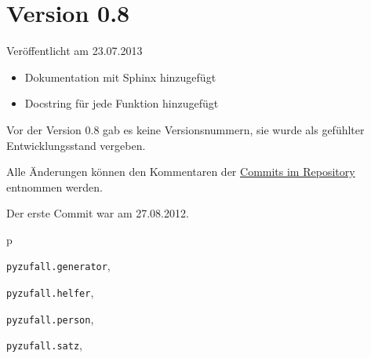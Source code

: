 \documentclass[a4paper,12pt,oneside]{sphinxmanual}
\begin{document}
\section{Version 0.8}
\label{changelog:version-0-8}
Veröffentlicht am 23.07.2013
\begin{itemize}
\item {} 
Dokumentation mit Sphinx hinzugefügt

\item {} 
Docstring für jede Funktion hinzugefügt

\end{itemize}

Vor der Version 0.8 gab es keine Versionsnummern, sie wurde als gefühlter Entwicklungsstand vergeben.

Alle Änderungen können den Kommentaren der \href{https://github.com/davidak/pyzufall/commits/}{Commits im Repository} entnommen werden.

Der erste Commit war am 27.08.2012.


\renewcommand{\indexname}{Python-Modulindex}
\begin{theindex}
\def\bigletter#1{{\Large\sffamily#1}\nopagebreak\vspace{1mm}}
\bigletter{p}
\item {\texttt{pyzufall.generator}}, \pageref{module:module-pyzufall.generator}
\item {\texttt{pyzufall.helfer}}, \pageref{module:module-pyzufall.helfer}
\item {\texttt{pyzufall.person}}, \pageref{module:module-pyzufall.person}
\item {\texttt{pyzufall.satz}}, \pageref{module:module-pyzufall.satz}
\end{theindex}

\renewcommand{\indexname}{Stichwortverzeichnis}
\printindex
\end{document}
